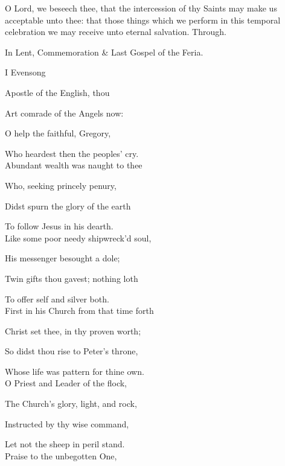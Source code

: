 \postcommunion
{} O Lord, we beseech thee, that the intercession of thy Saints may make us acceptable unto thee: that those things which we perform in this temporal celebration we may receive unto eternal salvation. Through.

\begin{rubric}
	In Lent, Commemoration \& Last Gospel of the Feria.
\end{rubric}


\begin{paracol}{2}[]
\sloppy
\begin{inhead}
	I Evensong
\end{inhead}
\begin{hangparas}{1.25em}{1}
Apostle of the English, thou

Art comrade of the Angels now:

O help the faithful, Gregory,

Who heardest then the peoples' cry.\\

Abundant wealth was naught to thee

Who, seeking princely penury,

Didst spurn the glory of the earth

To follow Jesus in his dearth.\\

Like some poor needy shipwreck'd soul,

His messenger besought a dole;

Twin gifts thou gavest; nothing loth

To offer self and silver both.\\

First in his Church from that time forth

Christ set thee, in thy proven worth;

So didst thou rise to Peter's throne,

Whose life was pattern for thine own.\\

O Priest and Leader of the flock,

The Church's glory, light, and rock,

Instructed by thy wise command,

Let not the sheep in peril stand.\\

Praise to the unbegotten One,


\end{hangparas}
\end{paracol}

